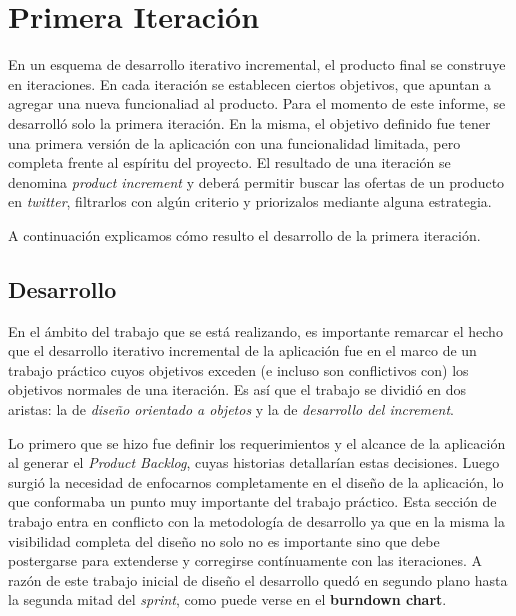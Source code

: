 \documentclass[10pt, a4paper]{article}
\begin{document}
\section{Primera Iteración}

En un esquema de desarrollo iterativo incremental, el producto final se construye en iteraciones. En cada iteración se establecen ciertos objetivos, que apuntan a agregar una nueva funcionaliad al producto. Para el momento de este informe, se desarrolló solo la primera iteración. En la misma, el objetivo definido fue tener una primera versión de la aplicación con una funcionalidad limitada, pero completa frente al espíritu del proyecto. El resultado de una iteración se denomina \emph{product increment} y deberá permitir buscar las ofertas de un producto en \emph{twitter}, filtrarlos con algún criterio y priorizalos mediante alguna estrategia.

A continuación explicamos cómo resulto el desarrollo de la primera iteración.

\subsection{Desarrollo}

En el ámbito del trabajo que se está realizando, es importante remarcar el hecho que el desarrollo iterativo incremental de la aplicación fue en el marco de un trabajo práctico cuyos objetivos exceden (e incluso son conflictivos con) los objetivos normales de una iteración. Es así que el trabajo se dividió en dos aristas: la de \emph{diseño orientado a objetos} y la de \emph{desarrollo del increment}. 

Lo primero que se hizo fue definir los requerimientos y el alcance de la aplicación al generar el \emph{Product Backlog}, cuyas historias detallarían estas decisiones. Luego surgió la necesidad de enfocarnos completamente en el diseño de la aplicación, lo que conformaba un punto muy importante del trabajo práctico. Esta sección de trabajo entra en conflicto con la metodología de desarrollo ya que en la misma la visibilidad completa del diseño no solo no es importante sino que debe postergarse para extenderse y corregirse contínuamente con las iteraciones. A razón de este trabajo inicial de diseño el desarrollo quedó en segundo plano hasta la segunda mitad del \emph{sprint}, como puede verse en el \textbf{burndown chart}.
\end{document}
